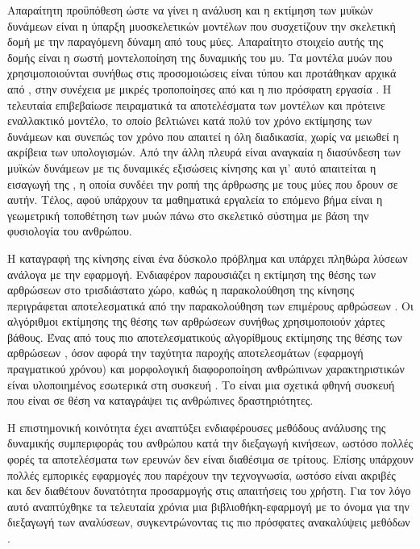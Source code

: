Απαραίτητη προϋπόθεση ώστε να γίνει η ανάλυση και η εκτίμηση των μυϊκών δυνάμεων είναι η ύπαρξη μυοσκελετικών μοντέλων που συσχετίζουν την σκελετική δομή με την παραγόμενη δύναμη από τους μύες. Απαραίτητο στοιχείο αυτής της δομής είναι η σωστή μοντελοποίηση της δυναμικής του μυ. Τα μοντέλα μυών που χρησιμοποιούνται συνήθως στις προσομοιώσεις είναι τύπου  και προτάθηκαν αρχικά από \cite{zajac89}, στην συνέχεια με μικρές τροποποίησες από \cite{thelen03} και η πιο πρόσφατη εργασία \cite{millard13}. Η τελευταία επιβεβαίωσε πειραματικά τα αποτελέσματα των μοντέλων και πρότεινε εναλλακτικό μοντέλο, το οποίο βελτιώνει κατά πολύ τον χρόνο εκτίμησης των δυνάμεων και συνεπώς τον χρόνο που απαιτεί η όλη διαδικασία, χωρίς να μειωθεί η ακρίβεια των υπολογισμών. Από την άλλη πλευρά είναι αναγκαία η διασύνδεση των μυϊκών δυνάμεων με τις δυναμικές εξισώσεις κίνησης και γι' αυτό απαιτείται η εισαγωγή της  \cite{delp95}, η οποία συνδέει την ροπή της άρθρωσης με τους μύες που δρουν σε αυτήν. Τέλος, αφού υπάρχουν τα μαθηματικά εργαλεία το επόμενο βήμα είναι η γεωμετρική τοποθέτηση των μυών πάνω στο σκελετικό σύστημα με βάση την φυσιολογία του ανθρώπου.

Η καταγραφή της κίνησης είναι ένα δύσκολο πρόβλημα και υπάρχει πληθώρα λύσεων ανάλογα με την εφαρμογή. Ενδιαφέρον παρουσιάζει η εκτίμηση της θέσης των αρθρώσεων στο τρισδιάστατο χώρο, καθώς η παρακολούθηση της κίνησης περιγράφεται αποτελεσματικά από την παρακολούθηση των επιμέρους αρθρώσεων \cite{poppe07}. Οι αλγόριθμοι εκτίμησης της θέσης των αρθρώσεων συνήθως χρησιμοποιούν χάρτες βάθους. Ένας από τους πιο αποτελεσματικούς αλγορίθμους εκτίμησης της θέσης των αρθρώσεων \cite{shotton11}, όσον αφορά την ταχύτητα παροχής αποτελεσμάτων (εφαρμογή πραγματικού χρόνου) και μορφολογική διαφοροποίηση ανθρώπινων χαρακτηριστικών είναι υλοποιημένος εσωτερικά στη συσκευή . Το  είναι μια σχετικά φθηνή συσκευή που είναι σε θέση να καταγράψει τις ανθρώπινες δραστηριότητες.

Η επιστημονική κοινότητα έχει αναπτύξει ενδιαφέρουσες μεθόδους ανάλυσης της δυναμικής συμπεριφοράς του ανθρώπου κατά την διεξαγωγή κινήσεων, ωστόσο πολλές φορές τα αποτελέσματα των ερευνών δεν είναι διαθέσιμα σε τρίτους. Επίσης υπάρχουν πολλές εμπορικές εφαρμογές που παρέχουν την τεχνογνωσία, ωστόσο είναι ακριβές και δεν διαθέτουν δυνατότητα προσαρμογής στις απαιτήσεις του χρήστη. Για τον λόγο αυτό αναπτύχθηκε τα τελευταία χρόνια μια βιβλιοθήκη-εφαρμογή με το όνομα  για την διεξαγωγή των αναλύσεων, συγκεντρώνοντας τις πιο πρόσφατες ανακαλύψεις μεθόδων \cite{delp07}.

